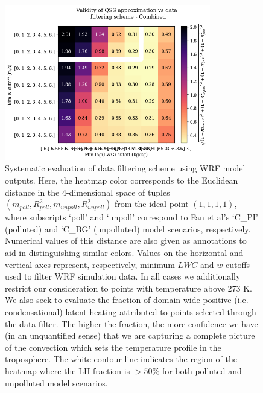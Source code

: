\documentclass{article}
\begin{document}
\begin{figure}[ht]
    \centering
    \includegraphics[width=9cm]{wrf/filtering_criteria_figure.png}
    \caption{Systematic evaluation of data filtering scheme using WRF model outputs. Here, the heatmap color corresponds to the Euclidean distance in the 4-dimensional space of tuples $(m_{poll}, R^2_{poll}, m_{unpoll}, R^2_{unpoll})$ from the ideal point $(1, 1, 1, 1)$, where subscripts `poll' and `unpoll' correspond to Fan et al's `C\_PI' (polluted) and `C\_BG' (unpolluted) model scenarios, respectively. Numerical values of this distance are also given as annotations to aid in distinguishing similar colors. Values on the horizontal and vertical axes represent, respectively, minimum $LWC$ and $w$ cutoffs used to filter WRF simulation data. In all cases we additionally restrict our consideration to points with temperature above 273 K. We also seek to evaluate the fraction of domain-wide positive (i.e. condensational) latent heating attributed to points selected through the data filter. The higher the fraction, the more confidence we have (in an unquantified sense) that we are capturing a complete picture of the convection which sets the temperature profile in the troposphere. The white contour line indicates the region of the heatmap where the LH fraction is $> 50\%$ for both polluted and unpolluted model scenarios.}
    \label{filtcritheatmap}
\end{figure}
\end{document}
